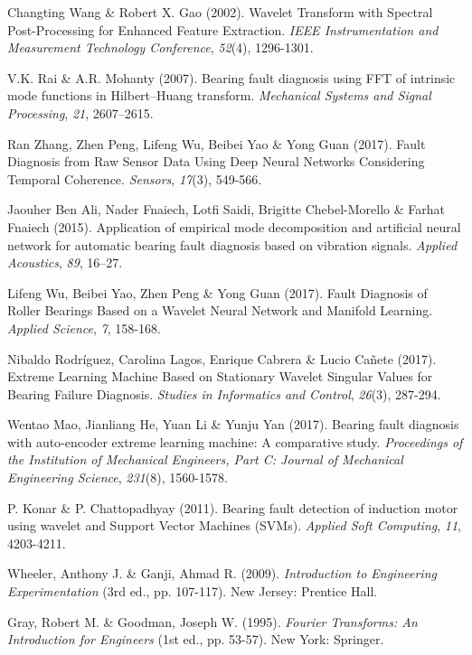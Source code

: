 \documentclass[a4paper,12pt]{article}
\begin{document}
\begin{thebibliography}{9}
 Changting Wang \& Robert X. Gao (2002). Wavelet Transform with Spectral Post-Processing for
Enhanced Feature Extraction. \textit{IEEE Instrumentation and Measurement Technology Conference}, \textit{52}(4), 1296-1301.

 V.K. Rai \& A.R. Mohanty (2007). Bearing fault diagnosis using FFT of intrinsic mode functions in Hilbert–Huang transform. \textit{Mechanical Systems and Signal Processing}, \textit{21}, 2607–2615.

 Ran Zhang, Zhen Peng, Lifeng Wu, Beibei Yao \& Yong Guan (2017). Fault Diagnosis from Raw Sensor Data Using Deep Neural Networks Considering Temporal Coherence. \textit{Sensors}, \textit{17}(3), 549-566.

 Jaouher Ben Ali, Nader Fnaiech, Lotfi Saidi, Brigitte Chebel-Morello \& Farhat Fnaiech (2015). Application of empirical mode decomposition and artificial neural network for automatic bearing fault diagnosis based on vibration signals. \textit{Applied Acoustics}, \textit{89}, 16–27.

 Lifeng Wu, Beibei Yao, Zhen Peng \& Yong Guan (2017). Fault Diagnosis of Roller Bearings Based on a Wavelet Neural Network and Manifold Learning. \textit{Applied Science}, \textit{7}, 158-168. 

 Nibaldo Rodríguez, Carolina Lagos, Enrique Cabrera \& Lucio Cañete (2017). Extreme Learning Machine Based on Stationary Wavelet Singular Values for Bearing Failure Diagnosis. \textit{Studies in Informatics and Control}, \textit{26}(3), 287-294.

 Wentao Mao, Jianliang He, Yuan Li \& Yunju Yan (2017). Bearing fault diagnosis with auto-encoder extreme learning machine: A comparative study. \textit{Proceedings of the Institution of Mechanical Engineers, Part C: Journal of Mechanical Engineering Science}, \textit{231}(8), 1560-1578.

 P. Konar \& P. Chattopadhyay (2011). Bearing fault detection of induction motor using wavelet and Support Vector Machines (SVMs). \textit{Applied Soft Computing}, \textit{11}, 4203-4211.

 Wheeler, Anthony J. \& Ganji, Ahmad R. (2009). \textit{Introduction to Engineering Experimentation} (3rd ed., pp. 107-117). New Jersey: Prentice Hall.

 Gray, Robert M. \& Goodman, Joseph W. (1995). \textit{Fourier Transforms: An Introduction for Engineers} (1st ed., pp. 53-57). New York: Springer.


\end{thebibliography}
\end{document}
